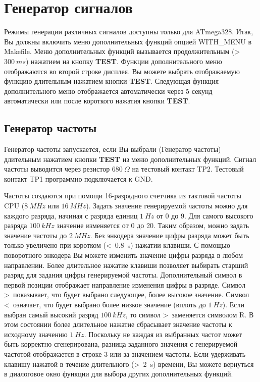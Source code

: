 \chapter{Генератор сигналов}

Режимы генерации различных сигналов доступны только для ATmega328.
Итак, Вы должны включить меню дополнительных функций опцией WITH\_MENU в Makefile.
Меню дополнительных функций вызывается продолжительным (>~\(300~ms\)) нажатием на кнопку 
\textbf{ TEST}. Функции дополнительного меню отображаются во второй строке дисплея. Вы можете 
выбрать отображаемую функцию длительным нажатием кнопки \textbf{ TEST}. 
Следующая функция дополнительного меню отображается автоматически через 5 секунд автоматически 
или после короткого нажатия кнопки \textbf{ TEST}.

\label{sec:generation}
\section{Генератор частоты}
Генератор частоты запускается, если Вы выбрали  (Генератор частоты) длительным 
нажатием кнопки \textbf{ TEST} из меню дополнительных функций.  
Сигнал частоты выводится через резистор \(680~\Omega\) на тестовый контакт TP2.
Тестовый контакт TP1 программно подключается к GND.

Частоты создаются при помощи 16-разрядного счетчика из тактовой частоты CPU (\(8~MHz\) или \(16~MHz\)).
Задать значение генерируемой частоты можно для каждого разряда, начиная с разряда единиц \(1~Hz\) от 0 до 9.
Для самого высокого разряда \(100~kHz\) значение изменяется от 0 до 20.
Таким образом, можно задать значение частоты до \(2~MHz\).
Без энкодера значение цифры разряда может быть только увеличено при коротком (\textless~0.8~s) нажатии клавиши.
С помощью поворотного энкодера Вы можете изменить значение цифры разряда в любом направлении.
Более длительное нажатие клавиши позволяет выбирать старший разряд для задания цифры генерируемой частоты.
Дополнительный символ в первой позиции отображает направление изменения цифры в разряде.
Символ \textgreater~показывает, что будет выбрано следующее, более высокое значение.
Символ \textless~означает, что будет выбрано более низкое значение (вплоть до \(1~Hz\)).
Если выбран самый высокий разряд \(100~kHz\), то символ \textgreater~заменяется символом R.
В этом состоянии более длительное нажатие сбрасывает значение частоты к исходному значению \(1~Hz\).
Поскольку не каждая из выбранных частот может быть корректно сгенерирована,
разница заданного значения с генерируемой частотой отображается в строке 3 или за значением частоты.
Если удерживать клавишу нажатой в течение длительного (\textgreater~2~s) времени, Вы можете вернуться 
в диалоговое окно функции для выбора
других дополнительных функций.

